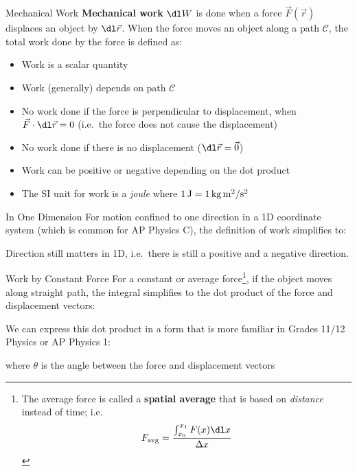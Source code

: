 \documentclass[12pt,compress,aspectratio=169]{beamer}
\begin{document}
\begin{frame}{Mechanical Work}
  \textbf{Mechanical work} $\dl W$ is done when a force $\vec F(\vec r)$
  displaces an object by $\dl\vec r$. When the force moves an object along a
  path $\mathcal C$, the total work done by the force is defined as:


  \begin{itemize}
  \item Work is a scalar quantity
  \item Work (generally) depends on path $\mathcal C$
  \item No work done if the force is perpendicular to displacement, when
    $\vec F\cdot\dl\vec r=0$ (i.e.\ the force does not cause the displacement)
  \item No work done if there is no displacement ($\dl\vec r=\vec 0$)
  \item Work can be positive or negative depending on the dot product
  \item The SI unit for work is a \emph{joule} where
    $\SI1\joule=\SI1{\kilogram.\metre^2\per\second^2}$
  \end{itemize}
\end{frame}



\begin{frame}{In One Dimension}
  For motion confined to one direction in a 1D coordinate system (which is
  common for AP Physics C), the definition of work simplifies to:
  

  Direction still matters in 1D, i.e.\ there is still a positive and a
  negative direction.
\end{frame}



\begin{frame}{Work by Constant Force}
  For a constant or average force\footnote{The average force is called a
  \textbf{spatial average} that is based on \emph{distance} instead of time;
  i.e.
  \begin{displaymath}
    F_\text{avg}=\frac{\int_{x_0}^{x_1}F(x)\dl x}{\Delta x}
  \end{displaymath}}, if the object moves along straight path, the
  integral simplifies to the dot product of the force and displacement vectors:


  \vspace{-.15in}We can express this dot product in a form that is more
  familiar in Grades 11/12 Physics or AP Physics 1:


  \vspace{-.1in}where $\theta$ is the angle between the force and displacement
  vectors
  \vspace{.3in}
\end{frame}
\end{document}
